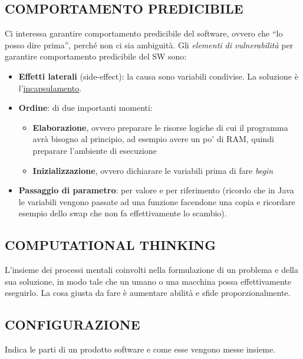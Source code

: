 		\subsection{COMPORTAMENTO PREDICIBILE}	\label{comportamentopredicibile} %
		Ci interessa garantire comportamento predicibile del software, ovvero che ``lo posso dire prima'', perché non ci sia ambiguità. Gli \textit{elementi di vulnerabilità} per garantire comportamento predicibile del SW sono:
		\begin{itemize}
			\item \textbf{Effetti laterali} (side-effect): la causa sono variabili condivise. La soluzione è l'\underline{\hyperref[incapsulamento]{incapsulamento}}.
			\item \textbf{Ordine}: di due importanti momenti:
			\begin{itemize}
				\item \textbf{Elaborazione}, ovvero preparare le risorse logiche di cui il programma avrà bisogno al principio, ad esempio avere un po' di RAM, quindi preparare l'ambiente di esecuzione
				\item \textbf{Inizializzazione}, ovvero dichiarare le variabili prima di fare \textit{begin}
			\end{itemize}
			\item \textbf{Passaggio di parametro}: per valore e per riferimento (ricordo che in Java le variabili vengono passate ad una funzione facendone una copia e ricordare esempio dello swap che non fa effettivamente lo scambio). %
		\end{itemize}


		\subsection{COMPUTATIONAL THINKING}  \label{computational}
		L'insieme dei processi mentali coinvolti nella formulazione di un problema e della sua soluzione, in modo tale che un umano o una macchina possa effettivamente eseguirlo. La cosa giusta da fare è aumentare abilità e sfide proporzionalmente.


		\subsection{CONFIGURAZIONE}  \label{configurazione}
		Indica le parti di un prodotto software e come esse vengono messe insieme.


